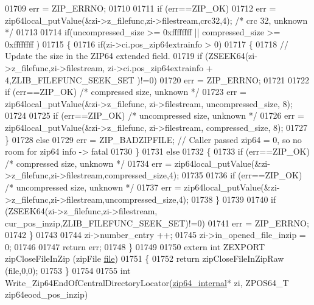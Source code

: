 \begin{DoxyCode}
01709             err = ZIP\_ERRNO;
01710 
01711         \textcolor{keywordflow}{if} (err==ZIP\_OK)
01712             err = zip64local\_putValue(&zi->z\_filefunc,zi->filestream,crc32,4); \textcolor{comment}{/* crc 32, unknown */}
01713 
01714         \textcolor{keywordflow}{if}(uncompressed\_size >= 0xffffffff || compressed\_size >= 0xffffffff )
01715         \{
01716           \textcolor{keywordflow}{if}(zi->ci.pos\_zip64extrainfo > 0)
01717           \{
01718             \textcolor{comment}{// Update the size in the ZIP64 extended field.}
01719             \textcolor{keywordflow}{if} (ZSEEK64(zi->z\_filefunc,zi->filestream, zi->ci.pos\_zip64extrainfo + 4,ZLIB\_FILEFUNC\_SEEK\_SET
      )!=0)
01720               err = ZIP\_ERRNO;
01721 
01722             \textcolor{keywordflow}{if} (err==ZIP\_OK) \textcolor{comment}{/* compressed size, unknown */}
01723               err = zip64local\_putValue(&zi->z\_filefunc, zi->filestream, uncompressed\_size, 8);
01724 
01725             \textcolor{keywordflow}{if} (err==ZIP\_OK) \textcolor{comment}{/* uncompressed size, unknown */}
01726               err = zip64local\_putValue(&zi->z\_filefunc, zi->filestream, compressed\_size, 8);
01727           \}
01728           \textcolor{keywordflow}{else}
01729               err = ZIP\_BADZIPFILE; \textcolor{comment}{// Caller passed zip64 = 0, so no room for zip64 info -> fatal}
01730         \}
01731         \textcolor{keywordflow}{else}
01732         \{
01733           \textcolor{keywordflow}{if} (err==ZIP\_OK) \textcolor{comment}{/* compressed size, unknown */}
01734               err = zip64local\_putValue(&zi->z\_filefunc,zi->filestream,compressed\_size,4);
01735 
01736           \textcolor{keywordflow}{if} (err==ZIP\_OK) \textcolor{comment}{/* uncompressed size, unknown */}
01737               err = zip64local\_putValue(&zi->z\_filefunc,zi->filestream,uncompressed\_size,4);
01738         \}
01739 
01740         \textcolor{keywordflow}{if} (ZSEEK64(zi->z\_filefunc,zi->filestream, cur\_pos\_inzip,ZLIB\_FILEFUNC\_SEEK\_SET)!=0)
01741             err = ZIP\_ERRNO;
01742     \}
01743 
01744     zi->number\_entry ++;
01745     zi->in\_opened\_file\_inzip = 0;
01746 
01747     \textcolor{keywordflow}{return} err;
01748 \}
01749 
01750 \textcolor{keyword}{extern} \textcolor{keywordtype}{int} ZEXPORT zipCloseFileInZip (zipFile \hyperlink{structfile}{file})
01751 \{
01752     \textcolor{keywordflow}{return} zipCloseFileInZipRaw (file,0,0);
01753 \}
01754 
01755 \textcolor{keywordtype}{int} Write\_Zip64EndOfCentralDirectoryLocator(\hyperlink{structzip64__internal}{zip64\_internal}* zi, ZPOS64\_T zip64eocd\_pos\_inzip)

\end{DoxyCode}
